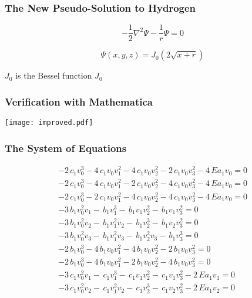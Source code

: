 \documentclass[11pt]{beamer}
\begin{document}
\begin{frame}
\frametitle{The New Pseudo-Solution to Hydrogen}

\[ - \frac{1}{2} \nabla^2 \Psi - \frac{1}{r} \Psi = 0 \]

\[ \Psi(x,y,z) = J_0(2\sqrt{x+r}) \]

\vskip 0.5in

$J_0$ is the Bessel function $J_0$

\end{frame}

\begin{frame}
\frametitle{Verification with Mathematica}
\texttt{[image: improved.pdf]}
\end{frame}

\begin{frame}
\frametitle{The System of Equations}
\fontsize{9}{11}\selectfont
\begin{minipage}{.7\linewidth}
\begin{equation*}
\begin{array}{r}
-2 \, c_{1} v_{0}^{3} - 4 \, c_{1} v_{0} v_{1}^{2} - 4 \, c_{1} v_{0} v_{2}^{2} - 2 \, c_{1} v_{0} v_{3}^{2} - 4 \, E a_{1} v_{0} =0\\
-2 \, c_{1} v_{0}^{3} - 4 \, c_{1} v_{0} v_{1}^{2} - 2 \, c_{1} v_{0} v_{2}^{2} - 4 \, c_{1} v_{0} v_{3}^{2} - 4 \, E a_{1} v_{0} =0\\
-2 \, c_{1} v_{0}^{3} - 2 \, c_{1} v_{0} v_{1}^{2} - 4 \, c_{1} v_{0} v_{2}^{2} - 4 \, c_{1} v_{0} v_{3}^{2} - 4 \, E a_{1} v_{0} =0\\
-3 \, b_{1} v_{0}^{2} v_{1} -  \, b_{1} v_{1}^{3} -  \, b_{1} v_{1} v_{2}^{2} -  \, b_{1} v_{1} v_{3}^{2} =0\\
-3 \, b_{1} v_{0}^{2} v_{2} -  \, b_{1} v_{1}^{2} v_{2} -  \, b_{1} v_{2}^{3} -  \, b_{1} v_{2} v_{3}^{2} =0\\
-3 \, b_{1} v_{0}^{2} v_{3} -  \, b_{1} v_{1}^{2} v_{3} -  \, b_{1} v_{2}^{2} v_{3} -  \, b_{1} v_{3}^{3} =0\\
-2 \, b_{1} v_{0}^{3} - 4 \, b_{1} v_{0} v_{1}^{2} - 4 \, b_{1} v_{0} v_{2}^{2} - 2 \, b_{1} v_{0} v_{3}^{2} =0\\
-2 \, b_{1} v_{0}^{3} - 4 \, b_{1} v_{0} v_{1}^{2} - 2 \, b_{1} v_{0} v_{2}^{2} - 4 \, b_{1} v_{0} v_{3}^{2} =0\\
-3 \, c_{1} v_{0}^{2} v_{1} -  \, c_{1} v_{1}^{3} -  \, c_{1} v_{1} v_{2}^{2} -  \, c_{1} v_{1} v_{3}^{2} - 2 \, E a_{1} v_{1} =0\\
-3 \, c_{1} v_{0}^{2} v_{2} -  \, c_{1} v_{1}^{2} v_{2} -  \, c_{1} v_{2}^{3} -  \, c_{1} v_{2} v_{3}^{2} - 2 \, E a_{1} v_{2} =0\\

\end{array}
\end{equation*}
\end{minipage}
\end{frame}
\end{document}
